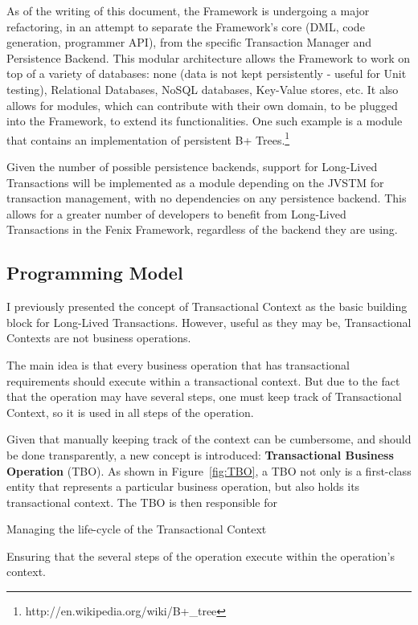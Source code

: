 \documentclass{llncs}
\begin{document}
As of the writing of this document, the Framework is undergoing a
major refactoring, in an attempt to separate the Framework's core
(DML, code generation, programmer API), from the specific Transaction
Manager and Persistence Backend. This modular architecture allows the
Framework to work on top of a variety of databases: none (data is not
kept persistently - useful for Unit testing), Relational Databases,
NoSQL databases, Key-Value stores, etc. It also allows for modules,
which can contribute with their own domain, to be plugged into the
Framework, to extend its functionalities. One such example is a module
that contains an implementation of persistent B+
Trees.\footnote{http://en.wikipedia.org/wiki/B+\_tree}

Given the number of possible persistence backends, support for
Long-Lived Transactions will be implemented as a module depending on
the JVSTM for transaction management, with no dependencies on any
persistence backend. This allows for a greater number of developers to
benefit from Long-Lived Transactions in the Fenix Framework,
regardless of the backend they are using.

\subsection{Programming Model}

I previously presented the concept of Transactional Context as the
basic building block for Long-Lived Transactions. However, useful as
they may be, Transactional Contexts are not business operations.

The main idea is that every business operation that has transactional
requirements should execute within a transactional context. But due to
the fact that the operation may have several steps, one must keep
track of Transactional Context, so it is used in all steps of the
operation.

Given that manually keeping track of the context can be cumbersome, and
should be done transparently, a new concept is introduced: {\bf
  Transactional Business Operation} (TBO). As shown in
Figure~\ref{fig:TBO}, a TBO not only is a first-class entity that
represents a particular business operation, but also holds its
transactional context. The TBO is then responsible for
\begin{inparaenum}[\itshape 1\upshape)]
\item Managing the life-cycle of the Transactional Context
\item Ensuring that the several steps of the operation execute within
  the operation's context.
\end{inparaenum}
\end{document}
